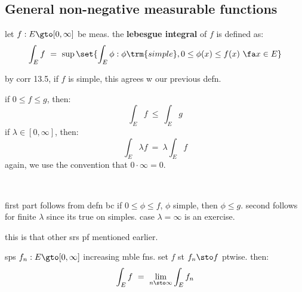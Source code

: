 \subsection{General non-negative measurable functions}

\begin{defn}
	let $f:E\gto[0,\infty]$ be meas.
	the \textbf{lebesgue integral} of $f$ is defined as:
	\begin{equation*}
		\int_{E}f \ = \ \sup\set{\int_{E}\phi:\phi \trm{ simple},0\leq\phi(x)\leq f(x) \ \fa x\in E}
	\end{equation*}
\end{defn}
by corr 13.5, if $f$ is simple, this agrees w our previous defn.

\begin{lm}
	if $0\leq f\leq g$, then:
	\begin{equation*}
		\int_{E}f \ \leq \ \int_{E}g
	\end{equation*}
	if $\lambda\in[0,\infty]$, then:
	\begin{equation*}
		\int_{E}\lambda f \ = \ \lambda\int_{E}f
	\end{equation*}
	again, 	we use the convention that $0\cdot \infty=0$.
\end{lm} \

\begin{pf}
	first part follows from defn bc if $0\leq\phi\leq f$, $\phi$ simple, then $\phi\leq g$.
	second follows for finite $\lambda$ since its true on simples.
	case $\lambda=\infty$ is an exercise.
\end{pf}

this is that other srs pf mentioned earlier.
\begin{thm}[title=Monotone Convergence Theorem]
	sps $f_{n}:E\gto[0,\infty]$ increasing mble fns.
	set $f$ st $f_{n}\sto f$ ptwise. then:
	\begin{equation*}
		\int_{E}f \ = \ \lim_{n\sto\infty}\int_{E}f_{n}
	\end{equation*}
\end{thm} \

